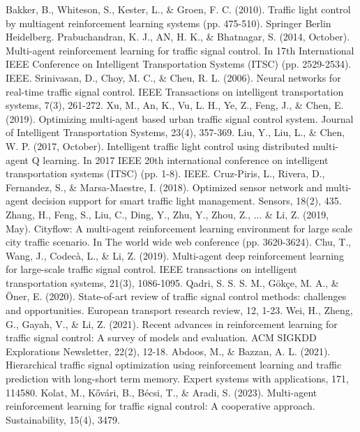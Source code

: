 \documentclass[conference]{IEEEtran}
\begin{document}
\begin{thebibliography}{00}
 Bakker, B., Whiteson, S., Kester, L., \& Groen, F. C. (2010). Traffic light control by multiagent reinforcement learning systems (pp. 475-510). Springer Berlin Heidelberg.
 Prabuchandran, K. J., AN, H. K., \& Bhatnagar, S. (2014, October). Multi-agent reinforcement learning for traffic signal control. In 17th International IEEE Conference on Intelligent Transportation Systems (ITSC) (pp. 2529-2534). IEEE.
 Srinivasan, D., Choy, M. C., \& Cheu, R. L. (2006). Neural networks for real-time traffic signal control. IEEE Transactions on intelligent transportation systems, 7(3), 261-272.
 Xu, M., An, K., Vu, L. H., Ye, Z., Feng, J., \& Chen, E. (2019). Optimizing multi-agent based urban traffic signal control system. Journal of Intelligent Transportation Systems, 23(4), 357-369.
 Liu, Y., Liu, L., \& Chen, W. P. (2017, October). Intelligent traffic light control using distributed multi-agent Q learning. In 2017 IEEE 20th international conference on intelligent transportation systems (ITSC) (pp. 1-8). IEEE.
 Cruz-Piris, L., Rivera, D., Fernandez, S., \& Marsa-Maestre, I. (2018). Optimized sensor network and multi-agent decision support for smart traffic light management. Sensors, 18(2), 435.
 Zhang, H., Feng, S., Liu, C., Ding, Y., Zhu, Y., Zhou, Z., ... \& Li, Z. (2019, May). Cityflow: A multi-agent reinforcement learning environment for large scale city traffic scenario. In The world wide web conference (pp. 3620-3624).
 Chu, T., Wang, J., Codecà, L., \& Li, Z. (2019). Multi-agent deep reinforcement learning for large-scale traffic signal control. IEEE transactions on intelligent transportation systems, 21(3), 1086-1095.
 Qadri, S. S. S. M., Gökçe, M. A., \& Öner, E. (2020). State-of-art review of traffic signal control methods: challenges and opportunities. European transport research review, 12, 1-23.
 Wei, H., Zheng, G., Gayah, V., \& Li, Z. (2021). Recent advances in reinforcement learning for traffic signal control: A survey of models and evaluation. ACM SIGKDD Explorations Newsletter, 22(2), 12-18.
 Abdoos, M., \& Bazzan, A. L. (2021). Hierarchical traffic signal optimization using reinforcement learning and traffic prediction with long-short term memory. Expert systems with applications, 171, 114580.
 Kolat, M., Kővári, B., Bécsi, T., \& Aradi, S. (2023). Multi-agent reinforcement learning for traffic signal control: A cooperative approach. Sustainability, 15(4), 3479.

\end{thebibliography}
\end{document}
